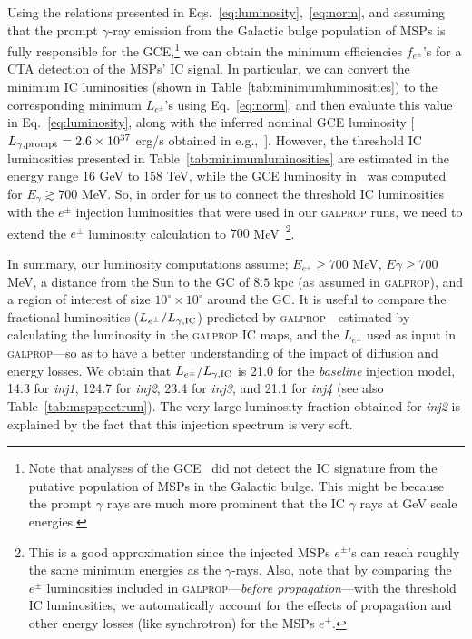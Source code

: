 \documentclass[doublespace,nopageskip]{VTthesis} %
\begin{document}
 Using the relations presented in Eqs.~\ref{eq:luminosity},~\ref{eq:norm}, and assuming that the prompt $\gamma$-ray emission from the Galactic bulge population of MSPs is fully responsible for the GCE,\footnote{Note that analyses of the  
 GCE~\citep{Lacroix:2015wfx} did not detect the IC signature from the putative population of MSPs in the Galactic bulge. This might be because the prompt $\gamma$ rays are much more prominent that the IC $\gamma$ rays at GeV scale energies.}  we can obtain the minimum efficiencies $f_{e^\pm}$'s for a CTA detection of the MSPs' IC signal. In particular, we can convert the minimum IC luminosities (shown in Table~\ref{tab:minimumluminosities}) to the corresponding minimum $L_{e^\pm}$'s using Eq.~\ref{eq:norm}, and then evaluate this value in  Eq.~\ref{eq:luminosity}, along with the inferred nominal GCE luminosity [$L_{\gamma, {\rm prompt}}=2.6\times 10^{37}$ erg/s obtained in e.g.,~\citet{Macias:2019omb}]. However, the threshold IC luminosities presented in Table~\ref{tab:minimumluminosities} are estimated in the energy range 16 GeV to 158 TeV, while the GCE luminosity in~\citet{Macias:2019omb} was computed for $E_{\gamma} \gtrsim 700$ MeV. So, in order for us to connect the threshold IC luminosities with the $e^\pm$ injection luminosities that were used in our \textsc{galprop} runs, we need to extend the $e^\pm$ luminosity calculation to $700$ MeV~\footnote{This is a good approximation since the injected MSPs $e^\pm$'s can reach roughly the same minimum energies as the $\gamma$-rays. Also, note that by comparing the $e^\pm$ luminosities included in \textsc{galprop}---\textit{before propagation}---with the threshold IC luminosities, we automatically account for the effects of propagation and other energy losses (like synchrotron) for the MSPs $e^\pm$.}. 

In summary, our luminosity computations assume; $E_{e^\pm}\geq700$ MeV, $E{\gamma}\geq700$ MeV, a distance from the Sun to the GC of $8.5$ kpc (as assumed in \textsc{galprop}), and a region of interest of size $10^\circ\times10^\circ$ around the GC. It is useful to compare the fractional luminosities ($L_{e^\pm}/L_{\gamma, {\rm IC}}$) predicted by \textsc{galprop}---estimated by calculating the luminosity in the \textsc{galprop} IC maps, and the $L_{e^\pm}$ used as input in \textsc{galprop}---so as to have a better understanding of the impact of diffusion and energy losses. We obtain that $L_{e^\pm}/L_{\gamma, {\rm IC}}$ is 21.0 for the \textit{baseline} injection model, 14.3 for \textit{inj1}, 124.7 for \textit{inj2}, 23.4 for \textit{inj3}, and 21.1 for \textit{inj4} (see also Table~\ref{tab:mspspectrum}). The very large luminosity fraction obtained for \textit{inj2} is explained by the fact that this injection spectrum is very soft.       
\end{document}
